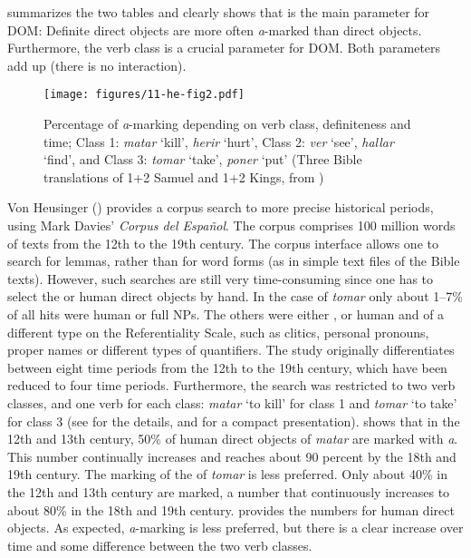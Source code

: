 \documentclass[output=paper]{LSP/langsci}
\begin{document}
 summarizes the two tables and clearly shows that  is the main parameter for DOM: Definite direct objects are more often \textit{a}-marked than  direct objects. Furthermore, the verb class is a crucial parameter for DOM. Both parameters add up (there is no interaction).

\begin{figure}%
	\centering
	\texttt{[image: figures/11-he-fig2.pdf]} %
\caption{Percentage of \textit{a}-marking depending on verb class, definiteness and time; Class 1: \textit{matar} ‘kill’,\textit{ herir} ‘hurt’, Class 2: \textit{ver} ‘see’, \textit{hallar} ‘find’, and Class 3: \textit{tomar} ‘take’, \textit{poner} ‘put’ (Three Bible translations of 1+2 Samuel and 1+2 Kings, from \citealt[607]{vonHeusingeretal2011Affectedness})} \label{11-he-fig:2}
\end{figure}

Von Heusinger (\citeyear{vonHeusinger2008Verbal}) provides a corpus search to more precise historical periods, using Mark Davies’ \textit{Corpus del Español}. The corpus comprises 100 million words of  texts from the 12th to the 19th century. 
The corpus interface allows one to search for lemmas, rather than for word forms (as in simple text files of the Bible texts). 
However, such searches are still very time-consuming since one has to select the  or  human direct objects by hand. In the case of \textit{tomar} only about 1–7\% of all hits were human  or  full NPs. 
The others were either , or human and of a different type on the Referentiality Scale, such as clitics, personal pronouns, proper names or different types of quantifiers. 
The study originally differentiates between eight time periods from the 12th to the 19th century, which have been reduced to four time periods. 
Furthermore, the search was restricted to two verb classes, and one verb for each class: \textit{matar} ‘to kill’ for class 1 and \textit{tomar} ‘to take’ for class 3 (see \citealt{vonHeusinger2008Verbal} for the details, and \citealt{vonHeusingeretal2011Affectedness} for a compact presentation).  shows that in the 12th and 13th century, 50\% of human  direct objects of \textit{matar} are marked with \textit{a}. 
This number continually increases and reaches about 90 percent by the 18th and 19th century. 
The marking of the   of \textit{tomar} is less preferred. 
Only about 40\% in the 12th and 13th century are marked, a number that continuously increases to about 80\% in the 18th and 19th century.  provides the numbers for human  direct objects. As expected, \textit{a}-marking is less preferred, but there is a clear increase over time and some difference between the two verb classes.
\end{document}
